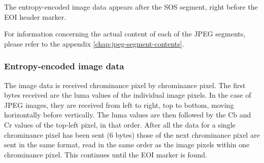 The entropy-encoded image data appears after the SOS segment,
right before the EOI header marker.

For information concerning the actual content of each of the 
JPEG segments, please refer to the appendix \ref{chap:jpeg-segment-contents}.

\subsubsection{Entropy-encoded image data}
\label{sec:entropycrho}

The image data is received chrominance pixel by chrominance pixel. 
The first bytes received are the luma values of the individual image pixels. 
In the case of JPEG images, they are received from left to right, top to bottom, moving horizontally before vertically. 
The luma values are then followed by the Cb and Cr values of the top-left pixel, in that order. 
After all the data for a single chrominance pixel has been sent (6 bytes) those of the next chrominance pixel are sent in the same format, 
read in the same order as the image pixels within one chrominance pixel. This continues until the EOI marker is found.
